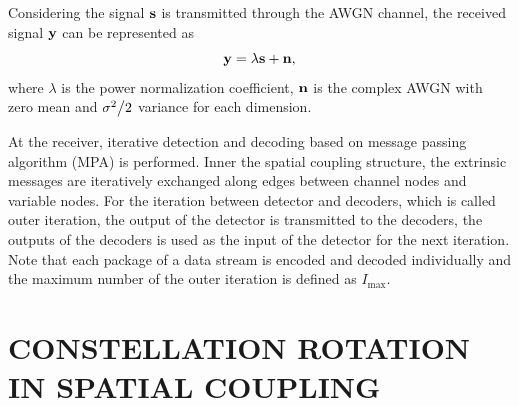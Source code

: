 \documentclass[conference]{IEEEtran}
\begin{document}
Considering the signal ${\bf{s}}$ is transmitted through the AWGN channel, the received signal ${\bf{y}}$ can be represented as
\begin{equation}
{\bf{y}} = \lambda {\bf{s}} + {\bf{n}}\label{3},
\end{equation}
where $\lambda $ is the power normalization coefficient, ${\bf{n}}$ is the complex AWGN with zero mean and ${{{\sigma ^2}} \mathord{\left/
 {\vphantom {{{\sigma ^2}} 2}} \right.
 \kern-\nulldelimiterspace} 2}$ variance for each dimension.

At the receiver, iterative detection and decoding based on message passing algorithm (MPA) is performed. Inner the spatial coupling structure, the extrinsic messages are iteratively exchanged along edges between channel nodes and variable nodes. For the iteration between detector and decoders, which is called outer iteration, the output of the detector is transmitted to the decoders, the outputs of the decoders is used as the input of the detector for the next iteration. Note that each package of a data stream is encoded and decoded individually and the maximum number of the outer iteration is defined as ${I_{\max }}$.
\section{CONSTELLATION ROTATION IN SPATIAL COUPLING}
\end{document}
